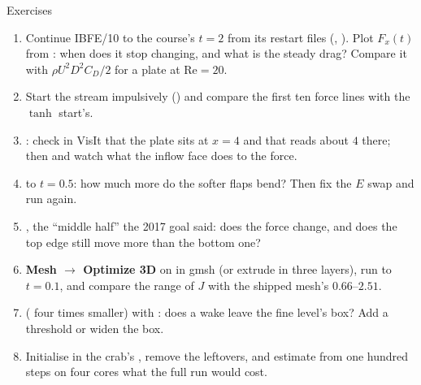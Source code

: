 \documentclass[aspectratio=169,11pt]{beamer}
\begin{document}
\begin{frame}{Exercises}
\label{fr:exercises}
\footnotesize
\begin{enumerate}
  \item Continue IBFE/10 to the course's $t = 2$ from its restart files (, ). Plot $F_x(t)$ from : when does it stop changing, and what is the steady drag? Compare it with $\rho U^2 D^2 C_D/2$ for a plate at $\mathrm{Re} = 20$.
  \item Start the stream impulsively () and compare the first ten force lines with the $\tanh$ start's.
  \item {}: check in VisIt that the plate sits at $x = 4$ and that  reads about $4$ there; then  and watch what the inflow face does to the force.
  \item {} to $t = 0.5$: how much more do the softer flaps bend? Then fix the $E$ swap and run again.
  \item {}, the ``middle half'' the 2017 goal said: does the force change, and does the top edge still move more than the bottom one?
  \item \textbf{Mesh $\to$ Optimize 3D} on  in gmsh (or extrude in three layers), run to $t = 0.1$, and compare the range of $J$ with the shipped mesh's $0.66$--$2.51$.
  \item {} ( four times smaller) with : does a wake leave the fine level's box? Add a threshold or widen the box.
  \item Initialise  in the crab's , remove the leftovers, and estimate from one hundred steps on four cores what the full run would cost.
\end{enumerate}
\end{frame}
\end{document}
